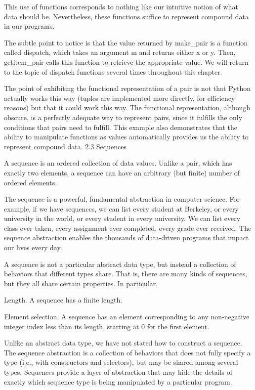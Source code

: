 \documentclass[letterpaper,10pt,dvipdfmx]{sphinxmanual}
\begin{document}
This use of functions corresponds to nothing like our intuitive notion of what data should be. Nevertheless, these functions suffice to represent compound data in our programs.

The subtle point to notice is that the value returned by make\_pair is a function called dispatch, which takes an argument m and returns either x or y. Then, getitem\_pair calls this function to retrieve the appropriate value. We will return to the topic of dispatch functions several times throughout this chapter.

The point of exhibiting the functional representation of a pair is not that Python actually works this way (tuples are implemented more directly, for efficiency reasons) but that it could work this way. The functional representation, although obscure, is a perfectly adequate way to represent pairs, since it fulfills the only conditions that pairs need to fulfill. This example also demonstrates that the ability to manipulate functions as values automatically provides us the ability to represent compound data.
2.3   Sequences

A sequence is an ordered collection of data values. Unlike a pair, which has exactly two elements, a sequence can have an arbitrary (but finite) number of ordered elements.

The sequence is a powerful, fundamental abstraction in computer science. For example, if we have sequences, we can list every student at Berkeley, or every university in the world, or every student in every university. We can list every class ever taken, every assignment ever completed, every grade ever received. The sequence abstraction enables the thousands of data-driven programs that impact our lives every day.

A sequence is not a particular abstract data type, but instead a collection of behaviors that different types share. That is, there are many kinds of sequences, but they all share certain properties. In particular,

Length. A sequence has a finite length.

Element selection. A sequence has an element corresponding to any non-negative integer index less than its length, starting at 0 for the first element.

Unlike an abstract data type, we have not stated how to construct a sequence. The sequence abstraction is a collection of behaviors that does not fully specify a type (i.e., with constructors and selectors), but may be shared among several types. Sequences provide a layer of abstraction that may hide the details of exactly which sequence type is being manipulated by a particular program.
\end{document}
